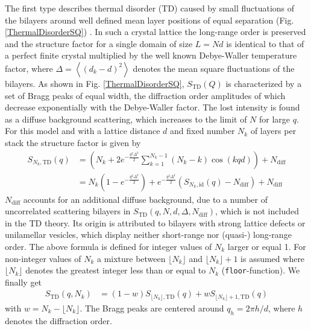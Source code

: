 The first type describes thermal disorder (TD) caused by small
fluctuations of the bilayers around well defined mean layer
positions of equal separation (Fig. \ref{ThermalDisorderSQ}) \cite{Pabst2003,Fruhwirth2004}. In
such a crystal lattice the long-range order is preserved and the
structure factor for a single domain of size $L = Nd$ is identical
to that of a perfect finite crystal multiplied by the well known
Debye-Waller temperature factor, where $\Delta = \left<
(d_k-d)^2\right>$ denotes the mean square fluctuations of the
bilayers. As shown in Fig. \ref{ThermalDisorderSQ},
$S_\text{TD}(Q)$ is characterized by a set of Bragg peaks of equal
width, the diffraction order amplitudes of which decrease
exponentially with the Debye-Waller factor. The lost intensity is
found as a diffuse background scattering, which increases to the
limit of $N$ for large $q$.
For this model and with a lattice distance $d$ and fixed number $N_k$  of layers per stack the structure factor is given by
\begin{align} \label{eq:TDMonoSum}
S_{N_k,\mathrm{TD}}(q) & = \left( N_k + 2 e^{-\frac{q^2\Delta^2}{2}} \sum_{k=1}^{N_k-1} (N_k-k) \cos(kqd) \right) +N_\mathrm{diff}\\
&= N_k \left(1-e^{-\frac{q^2\Delta^2}{2}}\right)+e^{-\frac{q^2\Delta^2}{2}}\left(S_{N_k,\mathrm{id}}(q)-N_\mathrm{diff}\right)+N_\mathrm{diff}
\end{align}
$N_\text{diff}$ accounts for an additional
diffuse background, due to a number of uncorrelated
scattering bilayers in $S_\text{TD}(q,N,d,\Delta,N_\text{diff})$,
which is not included in the TD theory.
Its origin is attributed to bilayers with strong lattice defects or
unilamellar vesicles, which display neither short-range nor
(quasi-) long-range order.
The above formula is defined for integer values of $N_k$ larger or equal 1. For non-integer values of $N_k$ a mixture between $\lfloor N_k\rfloor$ and $\lfloor N_k\rfloor+1$ is assumed where $\lfloor N_k \rfloor$ denotes the greatest integer less than or equal to $N_k$ (\texttt{\texttt{floor}}-function). We finally get
\begin{align} \label{eq:continuesSQTD}
S_\mathrm{TD}(q,N_k) &= (1-w)S_{\lfloor N_k\rfloor,\mathrm{TD}}(q) + w S_{\lfloor N_k\rfloor+1,\mathrm{TD}}(q)
\end{align}
with $w=N_k-\lfloor N_k\rfloor$.
The Bragg peaks are centered around $q_h=2\pi h/d$, where $h$ denotes
the diffraction order.



